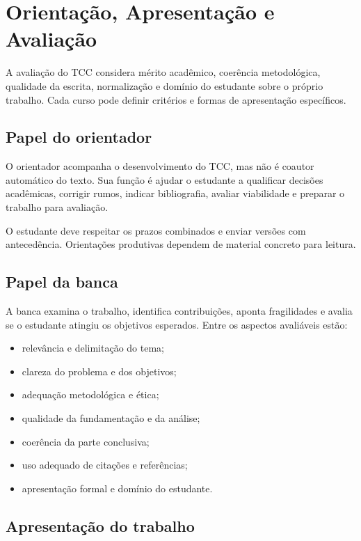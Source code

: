 \chapter{Orientação, Apresentação e Avaliação}

A avaliação do TCC considera mérito acadêmico, coerência metodológica, qualidade da escrita, normalização e domínio do estudante sobre o próprio trabalho. Cada curso pode definir critérios e formas de apresentação específicos.

\section{Papel do orientador}

O orientador acompanha o desenvolvimento do TCC, mas não é coautor automático do texto. Sua função é ajudar o estudante a qualificar decisões acadêmicas, corrigir rumos, indicar bibliografia, avaliar viabilidade e preparar o trabalho para avaliação.

O estudante deve respeitar os prazos combinados e enviar versões com antecedência. Orientações produtivas dependem de material concreto para leitura.

\section{Papel da banca}

A banca examina o trabalho, identifica contribuições, aponta fragilidades e avalia se o estudante atingiu os objetivos esperados. Entre os aspectos avaliáveis estão:

\begin{itemize}
  \item relevância e delimitação do tema;
  \item clareza do problema e dos objetivos;
  \item adequação metodológica e ética;
  \item qualidade da fundamentação e da análise;
  \item coerência da parte conclusiva;
  \item uso adequado de citações e referências;
  \item apresentação formal e domínio do estudante.
\end{itemize}

\section{Apresentação do trabalho}

